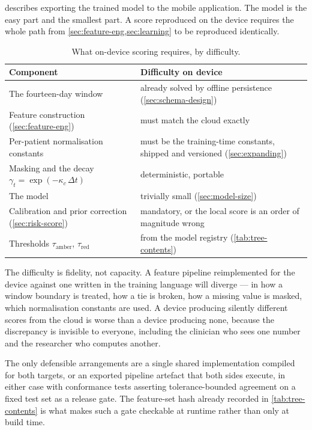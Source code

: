 \documentclass[12pt,a4paper,oneside]{report}
\begin{document}
\Textcite{cadrage2026} describes exporting the trained model to the mobile application. The model is the easy part and the smallest part. A score reproduced on the device requires the whole path from \cref{sec:feature-eng,sec:learning} to be reproduced identically.

\begin{table}[htbp]
\centering\small
\caption{What on-device scoring requires, by difficulty.}\label{tab:edge-requirements}
\begin{tabularx}{\textwidth}{@{}>{\raggedright\arraybackslash}p{6.4cm} X@{}}
\toprule
\textbf{Component} & \textbf{Difficulty on device} \\
\midrule
The fourteen-day window & already solved by offline persistence (\cref{sec:schema-design}) \\
Feature construction (\cref{sec:feature-eng}) & must match the cloud exactly \\
Per-patient normalisation constants & must be the training-time constants, shipped and versioned (\cref{sec:expanding}) \\
Masking and the decay $\gamma_t = \exp(-\kappa_c\,\Delta t)$ & deterministic, portable \\
The model & trivially small (\cref{sec:model-size}) \\
Calibration and prior correction (\cref{sec:risk-score}) & mandatory, or the local score is an order of magnitude wrong \\
Thresholds $\tau_{\text{amber}}$, $\tau_{\text{red}}$ & from the model registry (\cref{tab:tree-contents}) \\
\bottomrule
\end{tabularx}
\end{table}

The difficulty is fidelity, not capacity. A feature pipeline reimplemented for the device against one written in the training language will diverge --- in how a window boundary is treated, how a tie is broken, how a missing value is masked, which normalisation constants are used. A device producing silently different scores from the cloud is worse than a device producing none, because the discrepancy is invisible to everyone, including the clinician who sees one number and the researcher who computes another.

The only defensible arrangements are a single shared implementation compiled for both targets, or an exported pipeline artefact that both sides execute, in either case with conformance tests asserting tolerance-bounded agreement on a fixed test set as a release gate. The feature-set hash already recorded in \cref{tab:tree-contents} is what makes such a gate checkable at runtime rather than only at build time.
\end{document}
